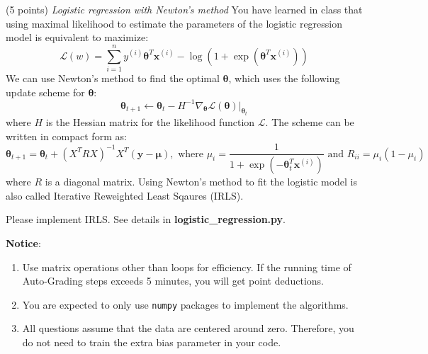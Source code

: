 \documentclass[a4paper, 12pt]{exam}
\begin{document}
\begin{questions}
		\question (5 points) \emph{Logistic regression with Newton's method} You have learned in class that using maximal likelihood to estimate the parameters of the logistic regression model is equivalent to maximize:
		\begin{equation*}
		\mathcal{L}(w) = \sum_{i=1}^n y^{(i)} \bm{\theta}^T \bm{x}^{(i)} - \log ( 1 + \exp(\bm{\theta}^T \bm{x}^{(i)}))
		\end{equation*}
		We can use Newton's method to find the optimal $\bm{\theta}$, which uses the following update scheme for $\bm{\theta}$:
		\begin{equation*}
		\bm{\theta}_{t+1} \leftarrow \bm{\theta}_t - H^{-1} \nabla_{\bm{\theta}} \mathcal{L}(\bm{\theta})|_{\bm{\theta}_t}
		\end{equation*}
		where $H$ is the Hessian matrix for the likelihood function $\mathcal{L}$.
		The scheme can be written in compact form as:
		\begin{equation*}
		\bm{\theta}_{t+1} = \bm{\theta}_t + (X^TRX)^{-1} X^T(\bm{y}-\bm{\mu}), \textrm{ where } \mu_i = \frac{1}{1+\exp(-\bm{\theta}_t^T\bm{x}^{(i)})} \textrm{ and } R_{ii} = \mu_i ( 1 - \mu_i)
		\end{equation*}
		where $R$ is a diagonal matrix. Using Newton's method to fit the logistic model is also called Iterative Reweighted Least Sqaures (IRLS).
		
		Please implement IRLS. See details in \textbf{logistic\_regression.py}.
		
	\end{questions}
	
	
	\nocite{*}
	\begin{flushleft}
		\textbf{Notice}: \\
		\begin{enumerate}
			\item Use matrix operations other than loops for efficiency. If the running time of Auto-Grading steps exceeds 5 minutes, you will get point deductions.
			\item You are expected to only use \texttt{numpy} packages to implement the algorithms.
			\item All questions assume that the data are centered around zero. Therefore, you do not need to train the extra bias parameter in your code.
		\end{enumerate}
	\end{flushleft}
	
\end{document}
